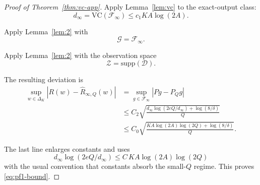 \documentclass{article} %
\providecommand{\D}{\mathcal{D}}
\providecommand{\simplex}{\Delta_K}
\providecommand{\Risk}{R}
\providecommand{\Fcal}{\mathcal{F}}
\providecommand{\VC}{\mathrm{VC}}
\begin{document}
\begin{proof}[Proof of Theorem~\ref{thm:vc-app}]
Apply Lemma~\ref{lem:vc} to the exact-output class:
\begin{equation}
\label{eq:thmconv-proof-vc}
d_\infty
=
\VC(\Fcal_\infty)
\le
c_1 K A\log(2A).
\end{equation}

Apply Lemma~\ref{lem:2} with
\begin{equation}
\label{eq:thmconv-proof-g}
\mathcal G=\Fcal_\infty .
\end{equation}

Apply Lemma~\ref{lem:2} with the observation space
\begin{equation}
\label{eq:thmconv-proof-z}
\mathcal Z=\mathrm{supp}(\D).
\end{equation}

The resulting deviation is
\begin{align}
\sup_{w\in\simplex}
\left|
\Risk(w)-\widehat{\Risk}_{\infty,Q}(w)
\right|
&=
\sup_{g\in\Fcal_\infty}|Pg-P_Qg|
\label{eq:pf1-final-a}
\\
&\le
C_2
\sqrt{
\frac{
d_\infty\log(2eQ/d_\infty)+\log(8/\delta)
}{Q}
}
\label{eq:pf1-final-b}
\\
&\le
C_0
\sqrt{
\frac{
K A\log(2A)\log(2Q)+\log(8/\delta)
}{Q}
}.
\label{eq:pf1-final-c}
\end{align}

The last line enlarges constants and uses
\begin{equation}
\label{eq:pf1-log-simplify}
d_\infty\log(2eQ/d_\infty)
\le
C\,K A\log(2A)\log(2Q)
\end{equation}
with the usual convention that constants absorb the small-\(Q\) regime. This
proves \eqref{eq:pf1-bound}.
\end{proof}
\end{document}
